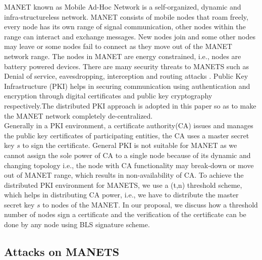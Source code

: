 \documentclass[11pt,a4paper]{llncs}
\begin{document}
MANET known as Mobile Ad-Hoc Network is a self-organized, dynamic and infra-structureless network\cite{anjum}. MANET consists of mobile nodes that roam freely, every node has its own range of signal communication, other nodes within the range can interact and exchange messages. New nodes join and some other nodes may leave or some nodes fail to connect as they move out of the MANET network range\cite{daza}. The nodes in MANET are energy constrained, i.e., nodes are battery powered devices. There are many security threats to MANETS such as Denial of service, eavesdropping, interception and routing attacks\cite{perrig} \cite{perrig2}. Public Key Infrastructure (PKI)\cite{kent} helps in securing communication using authentication and encryption through digital certificates and public key cryptography respectively.The distributed PKI approach is adopted in this paper so as to make the MANET network completely de-centralized. 
\vspace{0.2cm} \\
Generally in a PKI environment, a certificate authority(CA) issues and manages the public key certificates of participating entities, the CA uses a master secret key $s$ to sign the certificate. General PKI is not suitable for MANET as we cannot assign the sole power of CA to a single node because of its dynamic and changing topology i.e., the node with CA functionality may break-down or move out of MANET range, which results in non-availability of CA. To achieve the distributed PKI environment for MANETS, we use a (t,n) threshold scheme\cite{zhou}\cite{blakley}\cite{shamir}, which helps in distributing CA power, i.e., we have to distribute the master secret key $s$ to nodes of the MANET\cite{moca}. In our proposal, we discuss how a threshold number of nodes sign a certificate and the verification of the certificate can be done by any node using BLS signature scheme\cite{bls}.


\subsection{Attacks on MANETS\cite{attack}}
\end{document}
